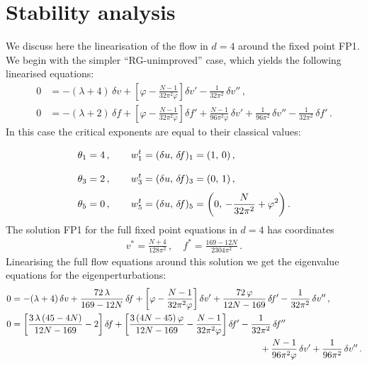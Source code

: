 \documentclass[11pt]{book} %
\begin{document}
\section{Stability analysis}

We discuss here the linearisation of the flow in $d=4$ around the fixed point FP1.
We begin with the simpler ``RG-unimproved'' case,
which yields the following linearised equations:
\begin{align}
  0 &= - (\lambda +4) \, \delta v
       + \left[ \varphi - \frac{N-1}{32 \pi^2 \varphi} \right] \delta v'
       - \frac{1}{32 \pi^2} \, \delta v'' \,, \\
  0 &= - (\lambda +2) \, \delta\! f
       + \left[ \varphi - \frac{N-1}{32\pi^2\varphi} \right] \delta\! f'
       + \frac{N-1}{96\pi^2\varphi} \, \delta v'
       + \frac{1}{96\pi^2} \, \delta v''
       - \frac{1}{32\pi^2} \, \delta\! f' \,.
\end{align}
In this case the critical exponents are equal to their classical values:
\begin{align}
  \theta_1 &= 4 \,, \qquad w_1^t = (\delta u, \, \delta\! f)_1 = \vphantom{\frac 11}      ( 1,\, 0) \,, \nonumber \\
  \theta_3 &= 2 \,, \qquad w_3^t = (\delta u, \, \delta\! f)_3 = \vphantom{\frac 11}      ( 0,\, 1) \,, \nonumber \\
  \theta_5 &= 0 \,, \qquad w_5^t = (\delta u, \, \delta\! f)_5 =                     \left( 0,\, -\frac{N}{32\pi^2}+\varphi^2 \right) .
\end{align}
The solution FP1 for the full fixed point equations in $d=4$ has coordinates
\begin{align}
  v^* = \frac{N+4}{128 \pi ^2} \,, \quad
  f^* = \frac{169-12 N}{2304 \pi ^2} \,.
\end{align}
Linearising the full flow equations around this solution
we get the eigenvalue equations for the eigenperturbations:
\begin{align}
  0 &= - (\lambda + 4) \, \delta v
       + \frac{72 \, \lambda}{169 - 12 N} \, \delta \!f
       + \left[ \varphi - \frac{N-1}{32 \pi^2 \varphi} \right] \delta v'
       + \frac{72 \, \varphi}{12N - 169} \, \delta\!f' - \frac{1}{32\pi^2} \, \delta v'' \,, \\
  0 &=   \left[ \frac{3 \, \lambda \, (45-4N)}{12N - 169}-2 \right] \delta\!f
       + \left[ \frac{3 \, (4N - 45) \, \varphi}{12N-169}
       - \frac{N-1}{32\pi^2\varphi} \right] \delta\!f'
       - \frac{1}{32\pi^2} \, \delta\!f'' \nonumber \\
       & \hspace{9.65cm}
         + \frac{N-1}{96\pi^2\varphi} \, \delta v'
         + \frac{1}{96\pi^2} \, \delta v'' \,.
\end{align}
\end{document}
